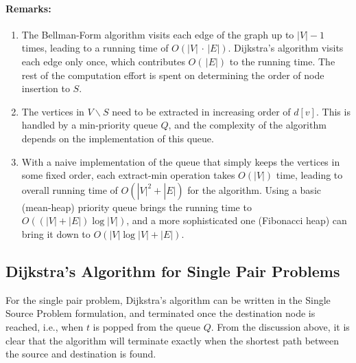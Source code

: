 \paragraph{Remarks:}
\begin{enumerate}
  \item The Bellman-Form algorithm visits each edge of the graph up to $|V|-1$ times, leading to a running time of $O(|V|\, \cdot \,|E|)$. Dijkstra's algorithm visits each edge only once, which contributes $O(\,|E|)$ to the running time. The rest of the computation effort is spent on determining the order of node insertion to $S$.
  \item	The vertices in $V\backslash S$ need to be extracted in increasing order of $d[v]$.  This is handled by a min-priority queue $Q$, and the complexity of the algorithm depends on the implementation of this queue.
  \item	With a naive implementation of the queue that simply keeps the vertices in some fixed order, each extract-min operation takes  $O(|V|)$ time, leading to overall running time of $O(|V{|^2} + |E|)$ for the algorithm. Using a basic (mean-heap) priority queue brings the running time to $O((|V| + |E|)\log |V|)$, and a more sophisticated one (Fibonacci heap) can bring it down to  $O(|V|\log |V| + |E|)$.
\end{enumerate}

\subsection{Dijkstra's Algorithm for Single Pair Problems}

For the single pair problem, Dijkstra's algorithm can be written in the Single Source Problem formulation, and terminated once the destination node is reached, i.e., when $t$ is popped from the queue $Q$. From the discussion above, it is clear that the algorithm will terminate exactly when the shortest path between the source and destination is found.

